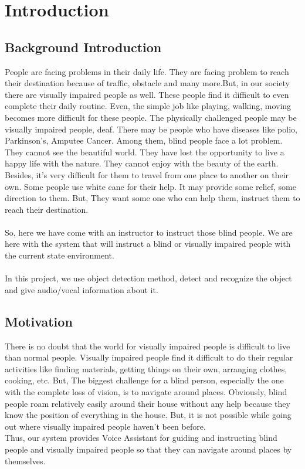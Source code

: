      \chapter{Introduction}
        \section{Background Introduction}
            People are facing problems in their daily life. They are facing problem to reach their destination because of traffic, obstacle and many more.But, in our society there are visually impaired people as well. These people find it difficult to even complete their daily routine. Even, the simple job like playing, walking, moving becomes more difficult for these people. The physically challenged people may be visually impaired people, deaf. There may be people who have diseases like polio, Parkinson's, Amputee Cancer. Among them, blind people face a lot problem. They cannot see the beautiful world. They have lost the opportunity to live a happy life with the nature. They cannot enjoy with the beauty of the earth. Besides, it's very difficult for them to travel from one place to another on their own. Some people use white cane for their help. It may provide some relief, some direction to them. But, They want some one who can help them, instruct them to reach their destination. \\
            \\
            So, here we have come with an instructor to instruct those blind people. We are here with the system that will instruct a blind or visually impaired people with the current state environment. \\
            \\
            In this project, we use object detection method, detect and recognize the object and give audio/vocal information about it. 
        \pagebreak
        \section{Motivation}
            There is no doubt that the world for visually impaired people is difficult to live than normal people. Visually impaired people find it difficult to do their regular activities like finding materials, getting things on their own, arranging clothes, cooking, etc. But, The biggest challenge for a blind person, especially the one with the complete loss of vision, is to navigate around places. Obviously, blind people roam relatively easily around their house without any help because they know the position of everything in the house. But, it is not possible while going out where visually impaired people haven’t been before. \\
            Thus, our system provides Voice Assistant for guiding and instructing blind people and visually impaired people so that they can navigate around places by themselves. 
            
